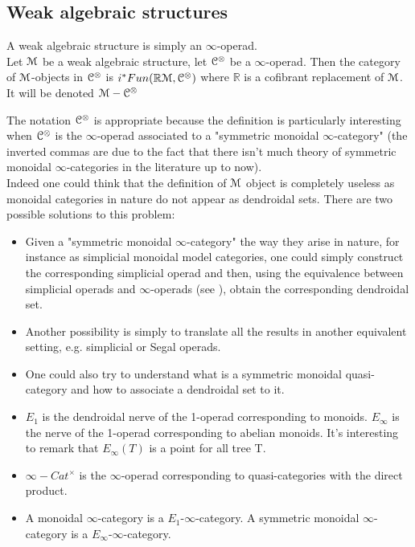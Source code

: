 \begin{refsection}
\section{Weak algebraic structures}
\begin{definition}
A weak algebraic structure is simply an $\infty$-operad.\\
Let $\mathcal{M}$ be a weak algebraic structure, let $\mathcal{C}^{\otimes}$ be a $\infty$-operad. Then the category of $\mathcal{M}$-objects in $\mathcal{C}^{\otimes}$
is $i^* Fun(\mathbb{R}\mathcal{M},\mathcal{C}^{\otimes})$ where $\mathbb{R}$ is a cofibrant replacement of $\mathcal{M}$. It will be denoted $\mathcal{M}-\mathcal{C}^{\otimes}$
\end{definition}

The notation $\mathcal{C}^{\otimes}$ is appropriate because the definition is particularly interesting when $\mathcal{C}^{\otimes}$ is the $\infty$-operad associated to a
"symmetric monoidal $\infty$-category" (the inverted commas are due to the fact that there isn't much theory of 
symmetric monoidal $\infty$-categories in the literature up to now).\\

Indeed one could think that the definition of $\mathcal{M}$ object is completely useless as monoidal categories in nature do not appear as dendroidal sets. There are two possible
solutions to this problem:
\begin{itemize}
 \item Given a "symmetric monoidal $\infty$-category" the way they arise in nature, for instance as simplicial monoidal model categories, one could simply construct the
corresponding simplicial operad and then, using the equivalence between simplicial operads and $\infty$-operads (see \cite{Ci-Mo2}), obtain the 
corresponding dendroidal set.
\item Another possibility is simply to translate all the results in another equivalent setting, e.g. simplicial or Segal operads.
\item One could also try to understand what is a symmetric monoidal quasi-category and how to associate a dendroidal set to it.
\end{itemize}


\begin{definition}
\begin{itemize}
 \item $E_1$ is the dendroidal nerve of the 1-operad corresponding to monoids. $E_{\infty}$ is the nerve of the 1-operad corresponding to abelian monoids. It's
interesting to remark that $E_{\infty}(T)$ is a point for all tree T.
\item $\infty-Cat^{\times}$ is the $\infty$-operad corresponding to quasi-categories with the direct product.
\item A monoidal $\infty$-category is a $E_1$-$\infty$-category. A symmetric monoidal $\infty$-category is a $E_{\infty}$-$\infty$-category. 
\end{itemize}
\end{definition}


\end{refsection}
